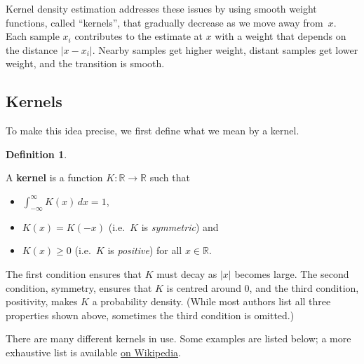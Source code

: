 \documentclass[
  a4paper,
]{article}
\providecommand{\tightlist}{%
  \setlength{\itemsep}{0pt}\setlength{\parskip}{0pt}}
\theoremstyle{definition}
\newtheorem{definition}{Definition}[section]
\theoremstyle{definition}
\theoremstyle{definition}
\theoremstyle{definition}
\theoremstyle{remark}
\begin{document}
Kernel density estimation addresses these issues by using smooth weight
functions, called ``kernels'', that gradually decrease as we move away from~\(x\).
Each sample \(x_i\) contributes to the estimate at \(x\) with a weight that depends
on the distance \(|x - x_i|\). Nearby samples get higher weight, distant samples
get lower weight, and the transition is smooth.

\subsection{Kernels}\label{kernels}

To make this idea precise, we first define what we mean by a kernel.

\begin{definition}
\protect\hypertarget{def:kernel}{}\label{def:kernel}

A \textbf{kernel} is a function \(K\colon \mathbb{R}\to \mathbb{R}\) such that

\begin{itemize}
\tightlist
\item
  \(\int_{-\infty}^\infty K(x) \,dx = 1\),
\item
  \(K(x) = K(-x)\) (i.e.~\(K\) is \emph{symmetric}) and
\item
  \(K(x) \geq 0\) (i.e.~\(K\) is \emph{positive}) for all \(x\in \mathbb{R}\).
\end{itemize}

\end{definition}

The first condition ensures that \(K\) must decay as \(|x|\) becomes large.
The second condition, symmetry, ensures that \(K\) is centred around \(0\),
and the third condition, positivity, makes \(K\) a probability density.
(While most authors list all three properties shown above, sometimes
the third condition is omitted.)

There are many different kernels in use. Some examples are listed
below; a more exhaustive list is available
\href{https://en.wikipedia.org/wiki/Kernel_(statistics)\#Kernel_functions_in_common_use}{on Wikipedia}.
\end{document}
